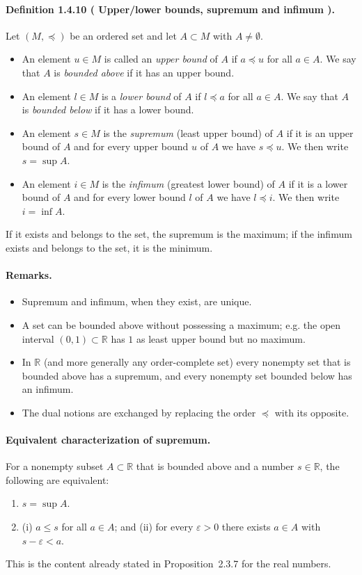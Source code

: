 \documentclass[12pt,a4paper]{article}
\newcommand{\R}{\mathbb{R}}
\newcommand{\eps}{\varepsilon}
\newcommand{\NumberedDefinition}[3]{%
	\paragraph{Definition #1 ( #2 ).} #3\par
}
\theoremstyle{plain}
\theoremstyle{definition}
\theoremstyle{remark}
\begin{document}
\NumberedDefinition{1.4.10}{Upper/lower bounds, supremum and infimum}{Let \((M,\preceq)\) be an ordered set and let \(A\subset M\) with \(A\neq\emptyset\).
\begin{itemize}[leftmargin=*]
	\item An element \(u\in M\) is called an \emph{upper bound} of \(A\) if \(a\preceq u\) for all \(a\in A\). We say that \(A\) is \emph{bounded above} if it has an upper bound.
	\item An element \(l\in M\) is a \emph{lower bound} of \(A\) if \(l\preceq a\) for all \(a\in A\). We say that \(A\) is \emph{bounded below} if it has a lower bound.
	\item An element \(s\in M\) is the \emph{supremum} (least upper bound) of \(A\) if it is an upper bound of \(A\) and for every upper bound \(u\) of \(A\) we have \(s\preceq u\). We then write \(s=\sup A\).
	\item An element \(i\in M\) is the \emph{infimum} (greatest lower bound) of \(A\) if it is a lower bound of \(A\) and for every lower bound \(l\) of \(A\) we have \(l\preceq i\). We then write \(i=\inf A\).
\end{itemize}
If it exists and belongs to the set, the supremum is the maximum; if the infimum exists and belongs to the set, it is the minimum.
}

\paragraph{Remarks.}
\begin{itemize}[leftmargin=*]
	\item Supremum and infimum, when they exist, are unique.
	\item A set can be bounded above without possessing a maximum; e.g. the open interval \((0,1)\subset \R\) has \(1\) as least upper bound but no maximum.
	\item In \(\R\) (and more generally any order-complete set) every nonempty set that is bounded above has a supremum, and every nonempty set bounded below has an infimum.
	\item The dual notions are exchanged by replacing the order \(\preceq\) with its opposite.
\end{itemize}

\paragraph{Equivalent characterization of supremum.} For a nonempty subset \(A\subset \R\) that is bounded above and a number \(s\in\R\), the following are equivalent:
\begin{enumerate}[label=\alph*) ,leftmargin=*]
	\item \(s=\sup A\).
	\item (i) \(a\le s\) for all \(a\in A\); and (ii) for every \(\eps>0\) there exists \(a\in A\) with \(s-\eps < a\).
\end{enumerate}
This is the content already stated in Proposition~2.3.7 for the real numbers.
\end{document}
